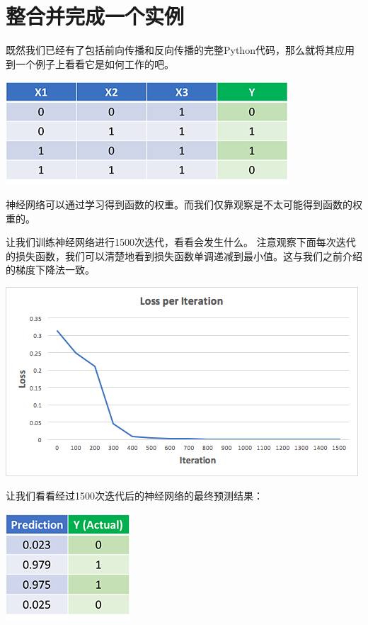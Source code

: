\section{整合并完成一个实例}

既然我们已经有了包括前向传播和反向传播的完整Python代码，那么就将其应用到一个例子上看看它是如何工作的吧。

\noindent\includegraphics[width=\textwidth]{4.png}

神经网络可以通过学习得到函数的权重。而我们仅靠观察是不太可能得到函数的权重的。

让我们训练神经网络进行1500次迭代，看看会发生什么。 注意观察下面每次迭代的损失函数，我们可以清楚地看到损失函数单调递减到最小值。这与我们之前介绍的梯度下降法一致。

\noindent\includegraphics[width=\textwidth]{5.png}

让我们看看经过1500次迭代后的神经网络的最终预测结果：

\noindent\includegraphics[width=\textwidth]{6.png}

